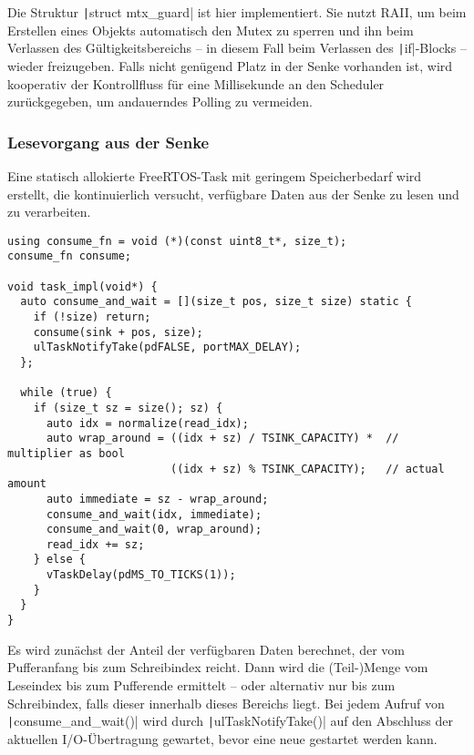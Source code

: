 Die Struktur \texttt|struct mtx_guard| ist hier implementiert. Sie
nutzt \ac{RAII}, um beim Erstellen eines Objekts automatisch den Mutex zu
sperren und ihn beim Verlassen des Gültigkeitsbereichs -- in diesem Fall beim
Verlassen des \texttt|if|-Blocks -- wieder freizugeben. Falls nicht
genügend Platz in der Senke vorhanden ist, wird kooperativ der Kontrollfluss für
eine Millisekunde an den Scheduler zurückgegeben, um andauerndes Polling zu
vermeiden.

\subsubsection{Lesevorgang aus der Senke}

Eine statisch allokierte FreeRTOS-Task mit geringem Speicherbedarf wird
erstellt, die kontinuierlich versucht, verfügbare Daten aus der Senke zu lesen
und zu verarbeiten.

\begin{code}
\begin{verbatim}
using consume_fn = void (*)(const uint8_t*, size_t);
consume_fn consume;

void task_impl(void*) {
  auto consume_and_wait = [](size_t pos, size_t size) static {
    if (!size) return;
    consume(sink + pos, size);
    ulTaskNotifyTake(pdFALSE, portMAX_DELAY);
  };

  while (true) {
    if (size_t sz = size(); sz) {
      auto idx = normalize(read_idx);
      auto wrap_around = ((idx + sz) / TSINK_CAPACITY) *  // multiplier as bool
                         ((idx + sz) % TSINK_CAPACITY);   // actual amount
      auto immediate = sz - wrap_around;
      consume_and_wait(idx, immediate);
      consume_and_wait(0, wrap_around);
      read_idx += sz;
    } else {
      vTaskDelay(pdMS_TO_TICKS(1));
    }
  }
}
\end{verbatim}
    \label{code:consumer_task}
\end{code}

Es wird zunächst der Anteil der verfügbaren Daten berechnet, der vom
Pufferanfang bis zum Schreibindex reicht. Dann wird die (Teil-)Menge vom
Leseindex bis zum Pufferende ermittelt -- oder alternativ nur bis zum
Schreibindex, falls dieser innerhalb dieses Bereichs liegt. Bei jedem Aufruf von
\texttt|consume_and_wait()| wird durch
\texttt|ulTaskNotifyTake()| auf den Abschluss der aktuellen
I/O-Übertragung gewartet, bevor eine neue gestartet werden kann.

